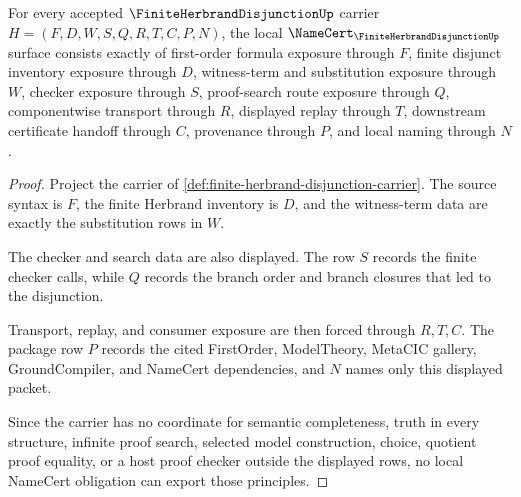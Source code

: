 \begin{theorem}
\label{thm:finite-herbrand-disjunction-namecert-obligations}
For every accepted $\FiniteHerbrandDisjunctionUp$ carrier $H=(F,D,W,S,Q,R,T,C,P,N)$, the local $\NameCert_{\FiniteHerbrandDisjunctionUp}$ surface consists exactly of first-order formula exposure through $F$, finite disjunct inventory exposure through $D$, witness-term and substitution exposure through $W$, checker exposure through $S$, proof-search route exposure through $Q$, componentwise transport through $R$, displayed replay through $T$, downstream certificate handoff through $C$, provenance through $P$, and local naming through $N$.
\end{theorem}
\begin{proof}
Project the carrier of \autoref{def:finite-herbrand-disjunction-carrier}. The source syntax is $F$, the finite Herbrand inventory is $D$, and the witness-term data are exactly the substitution rows in $W$.

The checker and search data are also displayed. The row $S$ records the finite checker calls, while $Q$ records the branch order and branch closures that led to the disjunction.

Transport, replay, and consumer exposure are then forced through $R,T,C$. The package row $P$ records the cited FirstOrder, ModelTheory, MetaCIC gallery, GroundCompiler, and NameCert dependencies, and $N$ names only this displayed packet.

Since the carrier has no coordinate for semantic completeness, truth in every structure, infinite proof search, selected model construction, choice, quotient proof equality, or a host proof checker outside the displayed rows, no local NameCert obligation can export those principles.
\end{proof}

